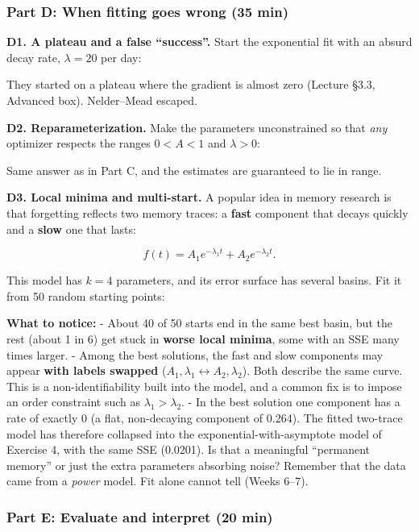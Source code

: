 \subsubsection{Part D: When fitting goes wrong (35 min)}

\textbf{D1. A plateau and a false ``success''.} Start the exponential
fit with an absurd decay rate, \(\lambda = 20\) per day:

They started on a plateau where the gradient is almost zero (Lecture
§3.3, Advanced box). Nelder--Mead escaped.

\textbf{D2. Reparameterization.} Make the parameters unconstrained so
that \emph{any} optimizer respects the ranges \(0 < A < 1\) and
\(\lambda > 0\):

Same answer as in Part C, and the estimates are guaranteed to lie in
range.

\textbf{D3. Local minima and multi-start.} A popular idea in memory
research is that forgetting reflects two memory traces: a \textbf{fast}
component that decays quickly and a \textbf{slow} one that lasts:

\[
f(t) = A_1 e^{-\lambda_1 t} + A_2 e^{-\lambda_2 t}.
\]

This model has \(k = 4\) parameters, and its error surface has several
basins. Fit it from 50 random starting points:

\textbf{What to notice:} - About 40 of 50 starts end in the same best
basin, but the rest (about 1 in 6) get stuck in \textbf{worse local
minima}, some with an SSE many times larger. - Among the best solutions,
the fast and slow components may appear \textbf{with labels swapped}
(\(A_1, \lambda_1 \leftrightarrow A_2, \lambda_2\)). Both describe the
same curve. This is a non-identifiability built into the model, and a
common fix is to impose an order constraint such as
\(\lambda_1 > \lambda_2\). - In the best solution one component has a
rate of exactly 0 (a flat, non-decaying component of 0.264). The fitted
two-trace model has therefore collapsed into the
exponential-with-asymptote model of Exercise 4, with the same SSE
(0.0201). Is that a meaningful ``permanent memory'' or just the extra
parameters absorbing noise? Remember that the data came from a
\emph{power} model. Fit alone cannot tell (Weeks 6--7).

\subsubsection{Part E: Evaluate and interpret (20 min)}

